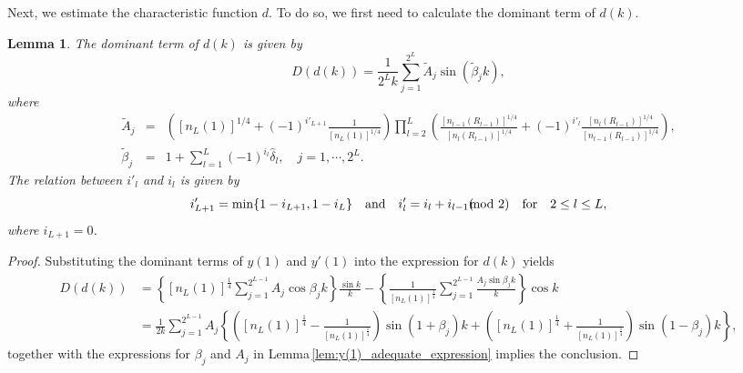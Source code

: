 \documentclass[11pt,reqno]{amsart}
\newtheorem{lemma}{Lemma}[section]
\theoremstyle{definition}
\theoremstyle{remark}
\numberwithin{equation}{section}
\begin{document}
Next, we estimate the characteristic function $d$. To do so, we first need to calculate the dominant term of $d(k)$.
\begin{lemma}\label{lem:main_term_d(k)}
The dominant term of $d(k)$ is given by
\begin{equation}\label{eq:full_main_term_dk}
	D(d(k)) = \frac{1}{2^L k} \sum_{j=1}^{2^L} \tilde{A}_j \sin(\tilde{\beta}_j k),
\end{equation}
where
\begin{eqnarray*}
	\tilde{A}_j &=& \left( \left[n_L(1)\right]^{1/4}
	+ (-1)^{i'_{L+1}} \frac{1}{\left[n_L(1)\right]^{1/4}} \right)
	\prod_{l=2}^{L} \left( \frac{\left[n_{l-1}(R_{l-1})\right]^{1/4}}{\left[n_l(R_{l-1})\right]^{1/4}}
	+ (-1)^{i'_l} \frac{\left[n_l(R_{l-1})\right]^{1/4}}{\left[n_{l-1}(R_{l-1})\right]^{1/4}} \right),\\
\tilde{\beta}_j &=& 1 + \sum\limits_{l=1}^{L} (-1)^{i_l} \hat{\delta}_l,\quad j=1,\cdots,2^{L}.
\end{eqnarray*}
The relation between $i'_l$ and $i_l$ is given by
\begin{equation*}
i'_{L+1} = \min \{ 1-i_{L+1}, 1-i_{L} \}
\quad \text{and} \quad
{i'_l} = {i_l + i_{l-1}}(\hspace{-3.5mm}\mod 2) \quad \text{for} \quad 2 \leq l \leq L,
\end{equation*}
where $i_{L+1}=0$.
\end{lemma}
\begin{proof}
Substituting the dominant terms of $y(1)$ and $y'(1)$ into the expression for $d(k)$ yields
\begin{equation*}
	\begin{aligned}
		D(d(k))&= \left\{\left[n_L(1)\right]^{\frac{1}{4}}\sum_{j=1}^{2^{L-1}}A_j\cos{\beta_j k} \right\}\frac{\sin{k}}{k}-\left\{\frac{1}{\left[n_L(1)\right]^{\frac{1}{4}}}\sum_{j=1}^{2^{L-1}}\frac{A_j\sin{\beta_j k} }{k} \right\}\cos{k}\\
&=\frac{1}{2k}\sum_{j=1}^{2^{L-1}}A_j\left\{\left(\left[n_L(1)\right]^{\frac{1}{4}}-\frac{1}{\left[n_L(1)\right]^{\frac{1}{4}}}\right)\sin{\left(1+\beta_j\right)k}+\left( \left[n_L(1)\right]^{\frac{1}{4}}+\frac{1}{\left[n_L(1)\right]^{\frac{1}{4}}}\right)\sin{\left(1-\beta_j\right)k} \right\},
	\end{aligned}
\end{equation*}
together with the expressions for $\beta_j$ and $A_j$ in Lemma\,\ref{lem:y(1)_adequate_expression} implies the conclusion.
\end{proof}
\end{document}
